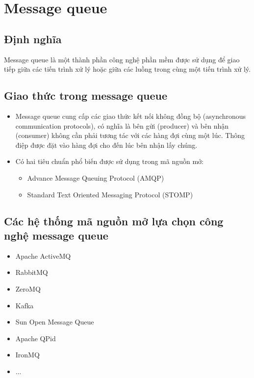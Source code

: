 \section{Message queue}
\subsection{Định nghĩa}
Message queue là một thành phần công nghệ phần mềm được sử dụng để giao tiếp giữa các tiến trình xử lý hoặc giữa các luồng trong cùng một tiến trình xử lý.

\subsection{Giao thức trong message queue}
\begin{itemize}
\item Message queue cung cấp các giao thức kết nối không đồng bộ (asynchronous communication protocols), có nghĩa là bên gửi (producer) và bên nhận (consumer) không cần phải tương tác với các hàng đợi cùng một lúc. Thông điệp được đặt vào hàng đợi cho đến lúc bên nhận lấy chúng.
\item Có hai tiêu chuẩn phổ biến được sử dụng trong mã nguồn mở:
\begin{itemize}
	\item Advance Message Queuing Protocol (AMQP)
	\item Standard Text Oriented Messaging Protocol (STOMP)
\end{itemize}
\end{itemize}

\subsection{Các hệ thống mã nguồn mở lựa chọn công nghệ message queue}

\begin{itemize}
	\item Apache ActiveMQ
	\item RabbitMQ
	\item ZeroMQ
	\item Kafka
	\item Sun Open Message Queue
	\item Apache QPid
	\item IronMQ
	\item ...
\end{itemize}